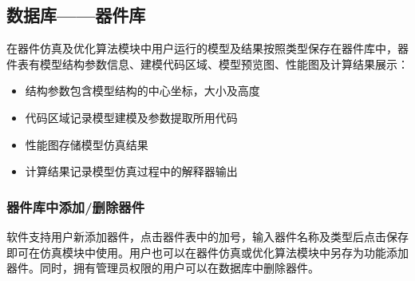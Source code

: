 \documentclass[letterpaper,10pt,english]{sphinxmanual}
\begin{document}
{{\sphinxAtStartPar
{}





\begin{sphinxVerbatim}[commandchars=\\\{\}]
  
\end{sphinxVerbatim}


\subsection{数据库——器件库}
\label{\detokenize{_u8f6f_u4ef6_u6a21_u5757_u4ecb_u7ecd/_u6570_u636e_u5e93/contents:id3}}
\sphinxAtStartPar
在器件仿真及优化算法模块中用户运行的模型及结果按照类型保存在器件库中，器件表有模型结构参数信息、建模代码区域、模型预览图、性能图及计算结果展示：


\sphinxAtStartPar
{}




\begin{itemize}
\item {} 
\sphinxAtStartPar
结构参数包含模型结构的中心坐标，大小及高度

\item {} 
\sphinxAtStartPar
代码区域记录模型建模及参数提取所用代码

\item {} 
\sphinxAtStartPar
性能图存储模型仿真结果

\item {} 
\sphinxAtStartPar
计算结果记录模型仿真过程中的解释器输出

\end{itemize}


\subsubsection{器件库中添加/删除器件}
\label{\detokenize{_u8f6f_u4ef6_u6a21_u5757_u4ecb_u7ecd/_u6570_u636e_u5e93/contents:id4}}
\sphinxAtStartPar
软件支持用户新添加器件，点击器件表中的加号，输入器件名称及类型后点击保存即可在仿真模块中使用。用户也可以在器件仿真或优化算法模块中另存为功能添加器件。同时，拥有管理员权限的用户可以在数据库中删除器件。


}}
\end{document}

